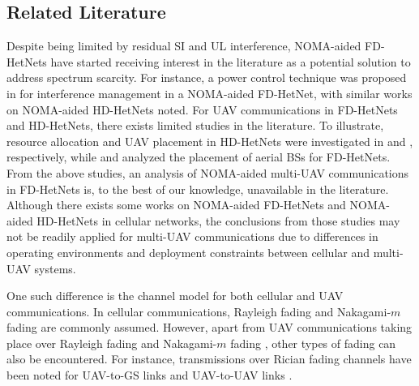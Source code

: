 \subsection{Related Literature}
Despite being limited by residual SI and UL interference, NOMA-aided FD-HetNets have started receiving interest in the literature as a potential solution to address spectrum scarcity. For instance, a power control technique was proposed in \cite{lei2018noma} for interference management in a NOMA-aided FD-HetNet, with similar works on NOMA-aided HD-HetNets \cite{moltafet2018optimal,liu2018heterogeneous} noted. For UAV communications in FD-HetNets and HD-HetNets, there exists limited studies in the literature. To illustrate, resource allocation and UAV placement in HD-HetNets were investigated in \cite{liu2019dsf} and \cite{sharma2016uavs}, respectively, while \cite{zhang20183} and \cite{zhang2018number} analyzed the placement of aerial BSs for FD-HetNets. From the above studies, an analysis of NOMA-aided multi-UAV communications in FD-HetNets is, to the best of our knowledge, unavailable in the literature. Although there exists some works on NOMA-aided FD-HetNets and NOMA-aided HD-HetNets in cellular networks, the conclusions from those studies may not be readily applied for multi-UAV communications due to differences in operating environments and deployment constraints between cellular and multi-UAV systems.

One such difference is the channel model for both cellular and UAV communications. In cellular communications, Rayleigh fading \cite{ding2018coexistence} and Nakagami-$m$ fading \cite{chu2018performance,hou2018multiple} are commonly assumed. However, apart from UAV communications taking place over Rayleigh fading \cite{zhao2019joint,mei2019uplink} and Nakagami-$m$ fading \cite{chetlur2017downlink}, other types of fading can also be encountered. For instance, transmissions over Rician fading channels have been noted for UAV-to-GS links \cite{matolak2017air_suburban,matolak2017air_water,sun2017air_hilly,tan2018joint,ernest2019noma,ernest2019power,nasir2019uav,nguyen2018novel} and UAV-to-UAV links \cite{tan2018joint,ernest2019power,yuan2018capacity}.


